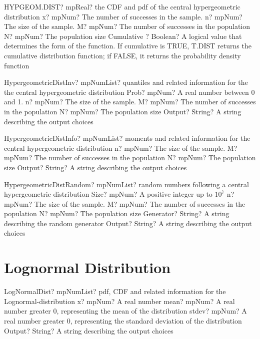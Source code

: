 \documentclass[12pt,a4paper,openany]{book}
\begin{document}
\begin{mpFunctionsExtract}
\mpWorksheetFunctionFiveNotImplemented
{HYPGEOM.DIST? mpReal? the CDF and pdf of the central hypergeometric distribution}
{x? mpNum? The number of successes in the sample.}
{n? mpNum? The size of the sample.}
{M? mpNum? The number of successes in the population}
{N? mpNum? The population size}
{Cumulative ? Boolean? A logical value that determines the form of the function. If cumulative is TRUE, T.DIST returns the cumulative distribution function; if FALSE, it returns the probability density function}
\end{mpFunctionsExtract}

\begin{mpFunctionsExtract}
\mpFunctionFiveNotImplemented
{HypergeometricDistInv? mpNumList? quantiles and related information for the the central hypergeometric distribution}
{Prob? mpNum? A real number between 0 and 1.}
{n? mpNum? The size of the sample.}
{M? mpNum? The number of successes in the population}
{N? mpNum? The population size}
{Output? String? A string describing the output choices}
\end{mpFunctionsExtract}

\begin{mpFunctionsExtract}
\mpFunctionFourNotImplemented
{HypergeometricDistInfo? mpNumList? moments and related information for the central hypergeometric distribution}
{n? mpNum? The size of the sample.}
{M? mpNum? The number of successes in the population}
{N? mpNum? The population size}
{Output? String? A string describing the output choices}
\end{mpFunctionsExtract}

\begin{mpFunctionsExtract}
\mpFunctionSixNotImplemented
{HypergeometricDistRandom? mpNumList? random numbers following a central hypergeometric distribution}
{Size? mpNum? A positive integer up to $10^7$}
{n? mpNum? The size of the sample.}
{M? mpNum? The number of successes in the population}
{N? mpNum? The population size}
{Generator? String? A string describing the random generator}
{Output? String? A string describing the output choices}
\end{mpFunctionsExtract}

\section{Lognormal Distribution}

\begin{mpFunctionsExtract}
\mpFunctionFourNotImplemented
{LogNormalDist? mpNumList? pdf, CDF and related information for the Lognormal-distribution}
{x? mpNum? A real number}
{mean? mpNum? A real number greater 0, representing the mean of the distribution}
{stdev? mpNum? A real number greater 0, representing the standard deviation of the distribution}
{Output? String? A string describing the output choices}
\end{mpFunctionsExtract}
\end{document}
